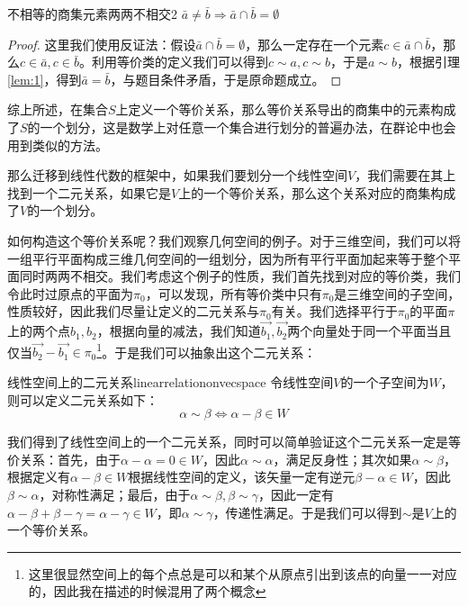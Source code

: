    \begin{lemma}{不相等的商集元素两两不相交}{2}
  $\bar{a}\ne \bar{b}\Rightarrow\bar{a}\cap\bar{b}=\emptyset$
   \end{lemma}
   \begin{proof}
   这里我们使用反证法：假设$\bar{a}\cap\bar{b}=\emptyset$，那么一定存在一个元素$c\in \bar{a}
   \cap \bar{b}$，那么$c\in \bar{a},c\in \bar{b}$。利用等价类的定义我们可以得到$c\sim a,c\sim b$，于是$a\sim b$，根据引理\ref{lem:1}，得到$\bar{a}=\bar{b}$，与题目条件矛盾，于是原命题成立。
   \end{proof}
   
   综上所述，在集合$S$上定义一个等价关系，那么等价关系导出的商集中的元素构成了$S$的一个划分，这是数学上对任意一个集合进行划分的普遍办法，在群论中也会用到类似的方法。
   
   那么迁移到线性代数的框架中，如果我们要划分一个线性空间$V$，我们需要在其上找到一个二元关系，如果它是$V$上的一个等价关系，那么这个关系对应的商集构成了$V$的一个划分。
   
   如何构造这个等价关系呢？我们观察几何空间的例子。对于三维空间，我们可以将一组平行平面构成三维几何空间的一组划分，因为所有平行平面加起来等于整个平面同时两两不相交。我们考虑这个例子的性质，我们首先找到对应的等价类，我们令此时过原点的平面为$\pi_0$，可以发现，所有等价类中只有$\pi_0$是三维空间的子空间，性质较好，因此我们尽量让定义的二元关系与$\pi_0$有关。我们选择平行于$\pi_0$的平面$\pi$上的两个点$b_1,b_2$，根据向量的减法，我们知道$\Vec{b_1},\Vec{b_2}$两个向量处于同一个平面当且仅当$\Vec{b_2}-\Vec{b_1}\in \pi_0$\footnote{这里很显然空间上的每个点总是可以和某个从原点引出到该点的向量一一对应的，因此我在描述的时候混用了两个概念}。于是我们可以抽象出这个二元关系：
   \begin{definition}{线性空间上的二元关系}{linearrelationonvecspace}
   令线性空间$V$的一个子空间为$W$，则可以定义二元关系如下：
   \begin{equation}
       \alpha\sim\beta\Longleftrightarrow \alpha-\beta \in W
   \end{equation}
   \end{definition}
   
   我们得到了线性空间上的一个二元关系，同时可以简单验证这个二元关系一定是等价关系：首先，由于$\alpha-\alpha=0\in W$，因此$\alpha\sim\alpha$，满足反身性；其次如果$\alpha\sim \beta$，根据定义有$\alpha-\beta\in W$根据线性空间的定义，该矢量一定有逆元$\beta-\alpha\in W$，因此$\beta\sim \alpha$，对称性满足；最后，由于$\alpha\sim\beta,\beta\sim \gamma$，因此一定有$\alpha-\beta+\beta-\gamma=\alpha-\gamma\in W$，即$\alpha\sim \gamma $，传递性满足。于是我们可以得到$\sim$是$V$上的一个等价关系。
   
